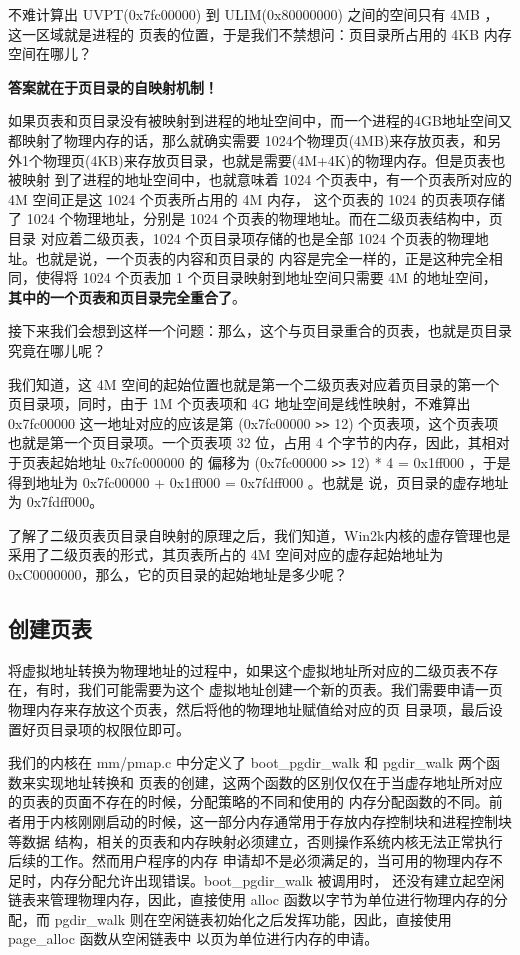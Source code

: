 不难计算出 UVPT(0x7fc00000) 到 ULIM(0x80000000) 之间的空间只有 4MB ，这一区域就是进程的
页表的位置，于是我们不禁想问：页目录所占用的 4KB 内存空间在哪儿？

\textbf{答案就在于页目录的自映射机制！}

如果页表和页目录没有被映射到进程的地址空间中，而一个进程的4GB地址空间又都映射了物理内存的话，那么就确实需要
1024个物理页(4MB)来存放页表，和另外1个物理页(4KB)来存放页目录，也就是需要(4M+4K)的物理内存。但是页表也被映射
到了进程的地址空间中，也就意味着 1024 个页表中，有一个页表所对应的 4M 空间正是这 1024 个页表所占用的 4M 内存，
这个页表的 1024 的页表项存储了 1024 个物理地址，分别是 1024 个页表的物理地址。而在二级页表结构中，页目录
对应着二级页表，1024 个页目录项存储的也是全部 1024 个页表的物理地址。也就是说，一个页表的内容和页目录的
内容是完全一样的，正是这种完全相同，使得将 1024 个页表加 1 个页目录映射到地址空间只需要 4M 的地址空间，
\textbf{其中的一个页表和页目录完全重合了}。

接下来我们会想到这样一个问题：那么，这个与页目录重合的页表，也就是页目录究竟在哪儿呢？

我们知道，这 4M 空间的起始位置也就是第一个二级页表对应着页目录的第一个页目录项，同时，由于 1M 个页表项和 4G
地址空间是线性映射，不难算出 0x7fc00000 这一地址对应的应该是第 (0x7fc00000 \verb|>>| 12) 个页表项，这个页表项
也就是第一个页目录项。一个页表项 32 位，占用 4 个字节的内存，因此，其相对于页表起始地址 0x7fc000000 的
偏移为 (0x7fc00000 \verb|>>| 12) * 4 = 0x1f\/f000 ，于是得到地址为 0x7fc00000 + 0x1f\/f000 = 0x7fdf\/f000 。也就是
说，页目录的虚存地址为 0x7fdf\/f000。

\begin{thinking}\label{think-windows_pde_addr}
了解了二级页表页目录自映射的原理之后，我们知道，Win2k内核的虚存管理也是采用了二级页表的形式，其页表所占的 4M
空间对应的虚存起始地址为 0xC0000000，那么，它的页目录的起始地址是多少呢？
\end{thinking}

\subsection{创建页表}

将虚拟地址转换为物理地址的过程中，如果这个虚拟地址所对应的二级页表不存在，有时，我们可能需要为这个
虚拟地址创建一个新的页表。我们需要申请一页物理内存来存放这个页表，然后将他的物理地址赋值给对应的页
目录项，最后设置好页目录项的权限位即可。

我们的内核在 mm/pmap.c 中分定义了 boot\_pgdir\_walk 和 pgdir\_walk 两个函数来实现地址转换和
页表的创建，这两个函数的区别仅仅在于当虚存地址所对应的页表的页面不存在的时候，分配策略的不同和使用的
内存分配函数的不同。前者用于内核刚刚启动的时候，这一部分内存通常用于存放内存控制块和进程控制块等数据
结构，相关的页表和内存映射必须建立，否则操作系统内核无法正常执行后续的工作。然而用户程序的内存
申请却不是必须满足的，当可用的物理内存不足时，内存分配允许出现错误。boot\_pgdir\_walk 被调用时，
还没有建立起空闲链表来管理物理内存，因此，直接使用 alloc 函数以字节为单位进行物理内存的分配，而
 pgdir\_walk 则在空闲链表初始化之后发挥功能，因此，直接使用 page\_alloc 函数从空闲链表中
以页为单位进行内存的申请。

